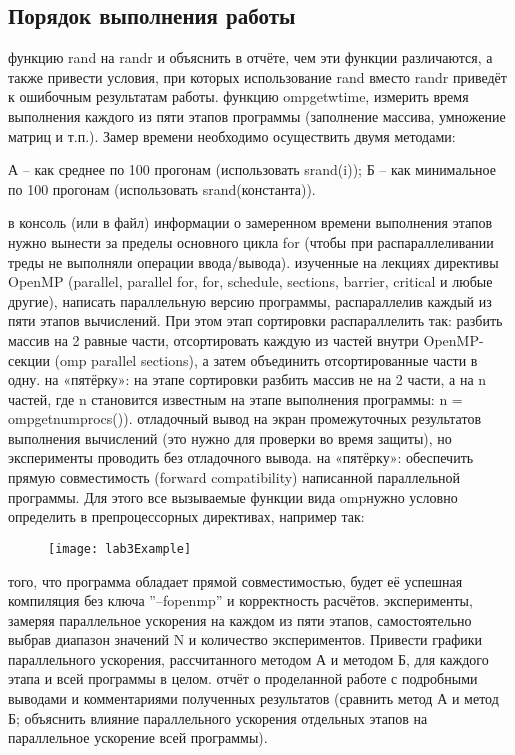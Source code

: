 { %
	\subsection{Порядок выполнения работы}
	\begin{enumerate}
		 функцию rand на rand\textunderscore r и объяснить в отчёте, чем эти функции различаются, а также привести условия, при которых использование rand вместо rand\textunderscore r приведёт к ошибочным результатам работы. 
		 функцию omp\textunderscore get\textunderscore wtime, измерить время выполнения каждого из пяти этапов программы (заполнение массива, умножение матриц и т.п.). Замер времени необходимо осуществить двумя методами:	
			\begin{itemize}
				 А – как среднее по 100 прогонам (использовать srand(i));
				 Б – как минимальное по 100 прогонам (использовать srand(константа)).	
			\end{itemize}
		 в консоль (или в файл) информации о замеренном времени выполнения этапов нужно вынести за пределы основного цикла for (чтобы при распараллеливании треды не выполняли операции ввода/вывода).
		 изученные на лекциях директивы OpenMP (parallel, parallel for, for, schedule, sections, barrier, critical и любые другие), написать параллельную версию программы, распараллелив каждый из пяти этапов вычислений. При этом этап сортировки распараллелить так: разбить массив на 2 равные части, отсортировать каждую из частей внутри OpenMP-секции (omp parallel sections), а затем объединить отсортированные части в одну.
		 на «пятёрку»: на этапе сортировки разбить массив не на 2 части, а на n частей, где n становится известным на этапе выполнения программы: n = omp\textunderscore get\textunderscore num\textunderscore procs()). 
		 отладочный вывод на экран промежуточных результатов выполнения вычислений (это нужно для проверки во время защиты), но эксперименты проводить без отладочного вывода. 
		 на «пятёрку»: обеспечить прямую совместимость (forward compatibility) написанной параллельной программы. Для этого все вызываемые функции вида omp\textunderscore * нужно условно определить в препроцессорных директивах, например так: 	   
			\begin{figure}[H]
				\texttt{[image: lab3Example]}
			\end{figure}
		 того, что программа обладает прямой совместимостью, будет её успешная компиляция без ключа ''–fopenmp'' и корректность расчётов.
		 эксперименты, замеряя параллельное ускорения на каждом из пяти этапов, самостоятельно выбрав диапазон значений N и количество экспериментов. Привести графики параллельного ускорения, рассчитанного методом А и методом Б, для каждого этапа и всей программы в целом. 
		 отчёт о проделанной работе с подробными выводами и комментариями полученных результатов (сравнить метод А и метод Б; объяснить влияние параллельного ускорения отдельных этапов на параллельное ускорение всей программы).
	\end{enumerate}
}